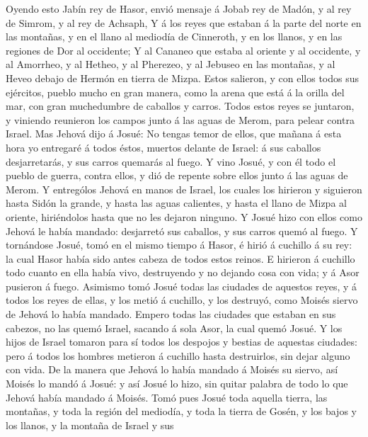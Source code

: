  Oyendo esto Jabín rey de Hasor, envió mensaje á Jobab rey
de Madón, y al rey de Simrom, y al rey de Achsaph,  Y á los
reyes que estaban á la parte del norte en las montañas, y en el llano al
mediodía de Cinneroth, y en los llanos, y en las regiones de Dor al
occidente;  Y al Cananeo que estaba al oriente y al
occidente, y al Amorrheo, y al Hetheo, y al Pherezeo, y al Jebuseo en
las montañas, y al Heveo debajo de Hermón en tierra de Mizpa.
 Estos salieron, y con ellos todos sus ejércitos, pueblo
mucho en gran manera, como la arena que está á la orilla del mar, con
gran muchedumbre de caballos y carros.  Todos estos reyes se
juntaron, y viniendo reunieron los campos junto á las aguas de Merom,
para pelear contra Israel.  Mas Jehová dijo á Josué: No
tengas temor de ellos, que mañana á esta hora yo entregaré á todos
éstos, muertos delante de Israel: á sus caballos desjarretarás, y sus
carros quemarás al fuego.  Y vino Josué, y con él todo el
pueblo de guerra, contra ellos, y dió de repente sobre ellos junto á las
aguas de Merom.  Y entrególos Jehová en manos de Israel, los
cuales los hirieron y siguieron hasta Sidón la grande, y hasta las aguas
calientes, y hasta el llano de Mizpa al oriente, hiriéndolos hasta que
no les dejaron ninguno.  Y Josué hizo con ellos como Jehová
le había mandado: desjarretó sus caballos, y sus carros quemó al fuego.
 Y tornándose Josué, tomó en el mismo tiempo á Hasor, é
hirió á cuchillo á su rey: la cual Hasor había sido antes cabeza de
todos estos reinos.  E hirieron á cuchillo todo cuanto en
ella había vivo, destruyendo y no dejando cosa con vida; y á Asor
pusieron á fuego.  Asimismo tomó Josué todas las ciudades
de aquestos reyes, y á todos los reyes de ellas, y los metió á cuchillo,
y los destruyó, como Moisés siervo de Jehová lo había mandado.
 Empero todas las ciudades que estaban en sus cabezos, no
las quemó Israel, sacando á sola Asor, la cual quemó Josué.
 Y los hijos de Israel tomaron para sí todos los despojos y
bestias de aquestas ciudades: pero á todos los hombres metieron á
cuchillo hasta destruirlos, sin dejar alguno con vida.  De
la manera que Jehová lo había mandado á Moisés su siervo, así Moisés lo
mandó á Josué: y así Josué lo hizo, sin quitar palabra de todo lo que
Jehová había mandado á Moisés.  Tomó pues Josué toda
aquella tierra, las montañas, y toda la región del mediodía, y toda la
tierra de Gosén, y los bajos y los llanos, y la montaña de Israel y sus
